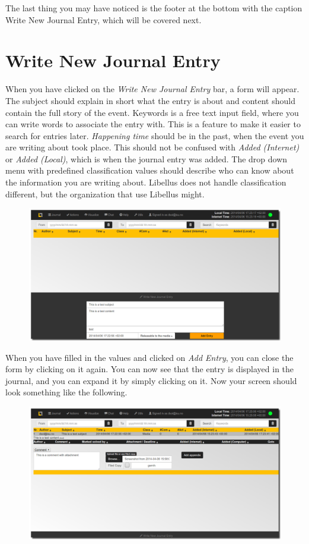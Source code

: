 \documentclass[letterpaper,10pt,english]{sphinxmanual}
\begin{document}
The last thing you may have noticed is the footer at the bottom with the caption Write New Journal Entry, which will be covered next.


\section{Write New Journal Entry}
\label{User manual:write-new-journal-entry}
When you have clicked on the \emph{Write New Journal Entry} bar, a form will appear. The subject should explain in short what the entry is about and content should contain the full story of the event. Keywords is a free text input field, where you can write words to associate the entry with. This is a feature to make it easier to search for entries later. \emph{Happening time} should be in the past, when the event you are writing about took place. This should not be confused with \emph{Added (Internet)} or \emph{Added (Local)}, which is when the journal entry was added. The drop down menu with predefined classification values should describe who can know about the information you are writing about. Libellus does not handle classification different, but the organization that use Libellus might.
\begin{figure}[htbp]
\centering

\includegraphics{journal1.png}
\end{figure}

When you have filled in the values and clicked on \emph{Add Entry}, you can close the form by clicking on it again. You can now see that the entry is displayed in the journal, and you can expand it by simply clicking on it. Now your screen should look something like the following.
\begin{figure}[htbp]
\centering

\includegraphics{journal2.png}
\end{figure}
\end{document}

